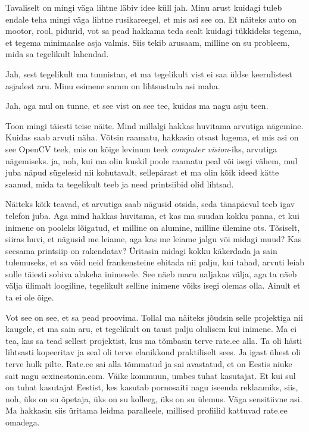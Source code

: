 
Tavaliselt on mingi väga lihtne läbiv idee küll jah. Minu arust kuidagi tuleb endale teha mingi väga lihtne rusikareegel, et mis asi see on. Et näiteks auto on mootor, rool, pidurid, vot sa pead hakkama teda sealt kuidagi tükkideks tegema, et tegema minimaalse asja valmis. Siis tekib arusaam, milline on su probleem, mida sa tegelikult lahendad. 


Jah, sest tegelikult ma tunnistan, et ma tegelikult vist ei saa üldse keerulistest asjadest aru. Minu esimene samm on lihtsustada asi maha. 


Jah, aga mul on tunne, et see vist on see tee, kuidas ma nagu asju teen. 

Toon mingi täiesti teise näite. Mind millalgi hakkas huvitama  arvutiga nägemine. Kuidas saab arvuti näha. Võtsin raamatu, hakkasin otsast lugema, et mis asi on see OpenCV teek, mis on kõige levinum teek \emph{computer vision}-iks, arvutiga nägemiseks. ja, noh, kui ma olin kuskil poole raamatu peal või isegi vähem, mul juba näpud sügelesid nii kohutavalt, sellepärast et ma olin kõik ideed kätte saanud, mida ta tegelikult teeb ja need printsiibid olid lihtsad. 

Näiteks kõik teavad, et arvutiga saab  nägusid otsida, seda tänapäeval teeb igav telefon juba. Aga mind hakkas huvitama, et kas ma  suudan kokku panna, et kui inimene on pooleks lõigatud, et milline on alumine, milline ülemine ots. Tõsiselt, siiras huvi, et nägusid me leiame, aga kas me leiame jalgu või midagi muud? Kas seesama printsiip on rakendatav? Üritasin midagi kokku käkerdada ja sain tulemuseks, et sa võid neid frankensteine ehitada nii palju, kui tahad, arvuti leiab sulle täiesti sobiva alakeha inimesele. See näeb maru naljakas välja, aga ta näeb välja ülimalt loogiline, tegelikult selline inimene võiks isegi olemas olla. Ainult et ta ei ole õige. 

Vot see on see, et sa pead proovima. Tollal ma näiteks jõudsin selle projektiga nii kaugele, et ma sain aru, et tegelikult on taust palju olulisem kui inimene. Ma ei tea, kas sa tead sellest projektist, kus ma tõmbasin terve rate.ee alla. Ta oli hästi lihtsasti kopeeritav ja  seal oli terve elanikkond praktiliselt sees. Ja igast ühest oli terve hulk pilte. Rate.ee sai alla tõmmatud ja sai avastatud, et on Eestis niuke sait nagu sexinestonia.com. Väike kommuun, umbes tuhat kasutajat. Et kui sul on tuhat kasutajat Eestist, kes kasutab pornosaiti nagu iseenda reklaamiks, siis, noh, üks on su õpetaja, üks on su kolleeg, üks on su ülemus. Väga  sensitiivne asi. Ma hakkasin siis üritama leidma  paralleele, millised profiilid kattuvad rate.ee omadega. 

